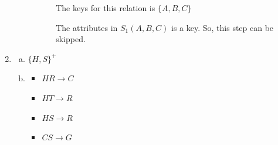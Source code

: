 \documentclass[12pt]{article}
\begin{document}
\begin{enumerate}[1.]
\begin{enumerate}[a)]
\begin{enumerate}[i)]
\begin{enumerate}[1.]
                \bigskip

                \color{red}
                The keys for this relation is $\{A,B,C\}$

                \bigskip

                The attributes in $S_1(A,B,C)$ is a key. So, this step can be skipped.
                \color{black}

                \bigskip

            \end{enumerate}
        \end{enumerate}

    \end{enumerate}

    \item


    \begin{enumerate}[a)]
        \item $\{H,S\}^+$
        \item

        \begin{itemize}
            \item $HR \to C$
            \item $HT \to R$
            \item $HS \to R$
            \item $CS \to G$
        \end{itemize}
    \end{enumerate}

\end{enumerate}
\end{document}
